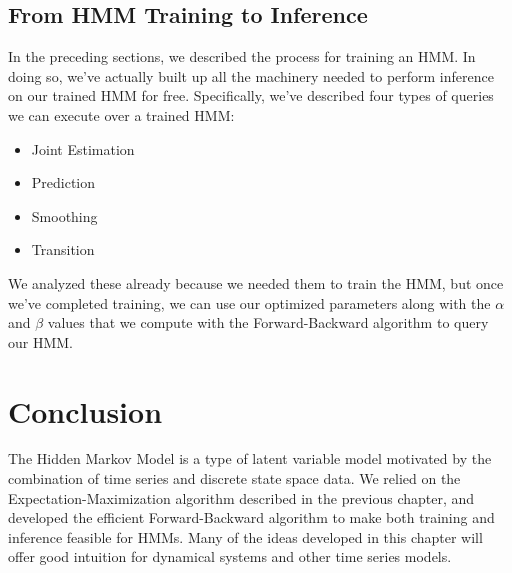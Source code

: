 \subsection{From HMM Training to Inference}
In the preceding sections, we described the process for training an HMM. In doing so, we've actually built up all the machinery needed to perform inference on our trained HMM for free. Specifically, we've described four types of queries we can execute over a trained HMM:
\begin{itemize}
	\item Joint Estimation
	\item Prediction
	\item Smoothing
	\item Transition
\end{itemize}
We analyzed these already because we needed them to train the HMM, but once we've completed training, we can use our optimized parameters along with the $\alpha$ and $\beta$ values that we compute with the Forward-Backward algorithm to query our HMM.

\section{Conclusion}
The Hidden Markov Model is a type of latent variable model motivated by the combination of time series and discrete state space data. We relied on the Expectation-Maximization algorithm described in the previous chapter, and developed the efficient Forward-Backward algorithm to make both training and inference feasible for HMMs. Many of the ideas developed in this chapter will offer good intuition for dynamical systems and other time series models.